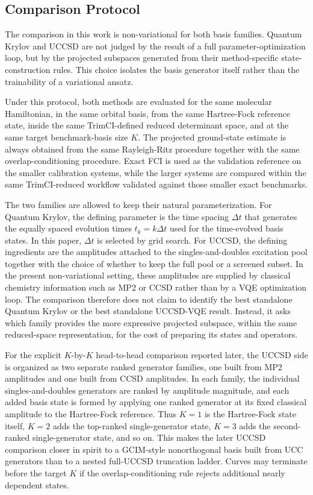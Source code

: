 \subsection{Comparison Protocol}

The comparison in this work is non-variational for both basis families. Quantum Krylov and UCCSD are not judged by the result of a full parameter-optimization loop, but by the projected subspaces generated from their method-specific state-construction rules. This choice isolates the basis generator itself rather than the trainability of a variational ansatz.

Under this protocol, both methods are evaluated for the same molecular Hamiltonian, in the same orbital basis, from the same Hartree-Fock reference state, inside the same TrimCI-defined reduced determinant space, and at the same target benchmark-basis size $K$. The projected ground-state estimate is always obtained from the same Rayleigh-Ritz procedure together with the same overlap-conditioning procedure. Exact FCI is used as the validation reference on the smaller calibration systems, while the larger systems are compared within the same TrimCI-reduced workflow validated against those smaller exact benchmarks.

The two families are allowed to keep their natural parameterization. For Quantum Krylov, the defining parameter is the time spacing $\Delta t$ that generates the equally spaced evolution times $t_k = k\Delta t$ used for the time-evolved basis states. In this paper, $\Delta t$ is selected by grid search. For UCCSD, the defining ingredients are the amplitudes attached to the singles-and-doubles excitation pool together with the choice of whether to keep the full pool or a screened subset. In the present non-variational setting, these amplitudes are supplied by classical chemistry information such as MP2 or CCSD rather than by a VQE optimization loop. The comparison therefore does not claim to identify the best standalone Quantum Krylov or the best standalone UCCSD-VQE result. Instead, it asks which family provides the more expressive projected subspace, within the same reduced-space representation, for the cost of preparing its states and operators.

For the explicit $K$-by-$K$ head-to-head comparison reported later, the UCCSD side is organized as two separate ranked generator families, one built from MP2 amplitudes and one built from CCSD amplitudes. In each family, the individual singles-and-doubles generators are ranked by amplitude magnitude, and each added basis state is formed by applying one ranked generator at its fixed classical amplitude to the Hartree-Fock reference. Thus $K=1$ is the Hartree-Fock state itself, $K=2$ adds the top-ranked single-generator state, $K=3$ adds the second-ranked single-generator state, and so on. This makes the later UCCSD comparison closer in spirit to a GCIM-style \cite{zheng2024gcim} nonorthogonal basis built from UCC generators than to a nested full-UCCSD truncation ladder. Curves may terminate before the target $K$ if the overlap-conditioning rule rejects additional nearly dependent states.

